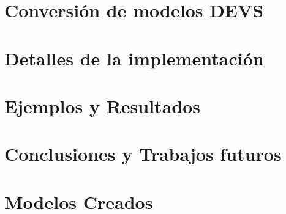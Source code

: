 \documentclass[a4paper,	11pt]{report}
\begin{document}
\chapter{Conversión de modelos DEVS}


\chapter{Detalles de la implementación}


\chapter{Ejemplos y Resultados}


\chapter{Conclusiones y Trabajos futuros}

\appendix
\chapter{Modelos Creados}

\newpage


\nocite{*}


\cleardoublepage



\end{document}
